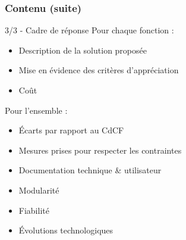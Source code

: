 \begin{frame}
\frametitle{Contenu (suite)}

\begin{exampleblock}{3/3 - Cadre de réponse}
Pour chaque fonction :
\begin{itemize}
    \item Description de la solution proposée
    \item Mise en évidence des critères d'appréciation
    \item Coût
\end{itemize}
Pour l'ensemble :
\begin{itemize}
    \item Écarts par rapport au CdCF
    \item Mesures prises pour respecter les contraintes
    \item Documentation technique \& utilisateur
    \item Modularité
    \item Fiabilité
    \item Évolutions technologiques
\end{itemize}
\end{exampleblock}

\end{frame} %


